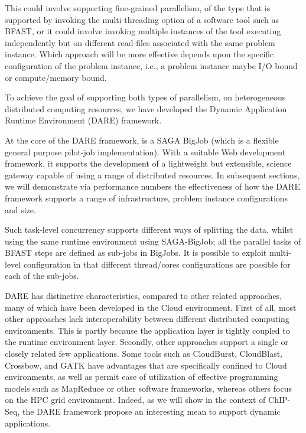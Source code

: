 \documentclass{cpeauth}
\begin{document}
This could involve supporting fine-grained parallelism, of the type
that is supported by invoking the multi-threading option of a software tool such as BFAST, or
it could involve invoking multiple instances of the tool executing
independently but on different read-files associated with the same
problem instance. Which approach will be more effective depends upon
the specific configuration of the problem instance, i.e., a problem
instance maybe I/O bound or compute/memory bound.

To achieve the goal of supporting both types of parallelism, on
heterogeneous distributed computing resources, we have developed the
Dynamic Application Runtime Environment (DARE)
framework\cite{dareurl,dare-tg11,dare-ecmls11}.

At the core of the DARE framework, is a SAGA BigJob (which is a
flexible general purpose pilot-job
implementation)\cite{saga-ccgrid10,saga-royalsoc,saga-web,jha2009developing,ecmls10}.
With a suitable Web development framework, it supports the development
of a lightweight but extensible, science gateway capable of using a
range of distributed resources.  In subsequent sections, we will
demonstrate via performance numbers the effectiveness of how the DARE
framework supports a range of infrastructure, problem instance
configurations and size.

Such task-level concurrency supports different ways of splitting the
data, whilst using the same runtime environment using SAGA-BigJob; all
the parallel tasks of BFAST steps are defined as sub-jobs in BigJobs.
It is possible to exploit multi-level configuration in that different
thread/cores configurations are possible for each of the sub-jobs.

DARE has distinctive characteristics, compared to other related
approaches\cite{taylor2010,cloudburst, cloudblast,
  langmead2009,langmead2010,gatk,halligan2009,luyf-2010}, many of
which have been developed in the Cloud environment.  First of all,
most other approaches lack interoperability between different
distributed computing environments.  This is partly because the
application layer is tightly coupled to the runtime environment layer.
Secondly, other approaches support a single or closely related few
applications.  Some tools such as CloudBurst\cite{cloudburst},
CloudBlast\cite{cloudblast}, Crossbow\cite{langmead2009}, and
GATK\cite{gatk} have advantages that are specifically confined to
Cloud environments, as well as permit ease of utilization of effective
programming models such as MapReduce or other software frameworks,
whereas others\cite{luyf-2010} focus on the HPC grid environment.
Indeed, as we will show in the context of ChIP-Seq, the DARE framework
propose an interesting mean to support dynamic applications.
\end{document}

